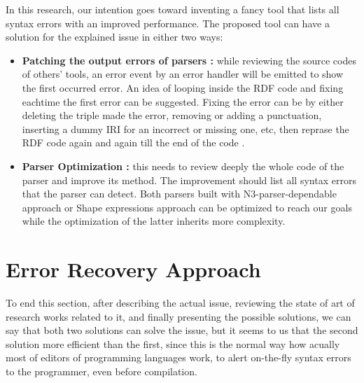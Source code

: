 \par
In this research, our intention goes toward inventing a fancy tool that lists all syntax errors with an improved performance. The proposed tool can have a solution for the explained issue in either two ways: 
\begin{itemize}[noitemsep] 
	\item \textbf{Patching the output errors of parsers :} while reviewing the source codes of others' tools, an error event by an error handler will be emitted to show the first occurred error. An idea of looping inside the RDF code and  fixing eachtime the first error can be suggested. Fixing the error can be by either deleting the triple made the error, removing or adding a punctuation, inserting a dummy IRI for an incorrect or missing one,  etc, then reprase the RDF code again and again till the end of the code .
	\item \textbf{Parser Optimization :} this needs to review deeply the whole code of the parser and improve its method. The improvement should list all syntax errors that the parser can detect. Both parsers built with N3-parser-dependable approach or Shape expressions approach can be optimized to reach our goals while the optimization of the latter inherits more complexity. 
\end{itemize} 

\section{Error Recovery Approach}


\par
To end this section, after describing the actual issue, reviewing the state of art of research works related to it, and finally presenting the possible solutions, we can say that both two solutions can solve the issue, but it seems to us that the second solution more efficient than the first, since this is the normal way how acually most of editors of programming languages work, to alert on-the-fly syntax errors to the programmer, even before compilation. 










